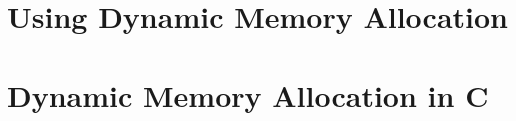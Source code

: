
\clearpage
\section{Using Dynamic Memory Allocation} %
\label{sec:using_dynamic_memory_allocation}




\clearpage
\def\pageLang{c}
\section{Dynamic Memory Allocation in C} %
\label{sec:dynamic_memory_allocation_in_c}









\clearpage
\def\pageLang{none}

% 
% 
% 

